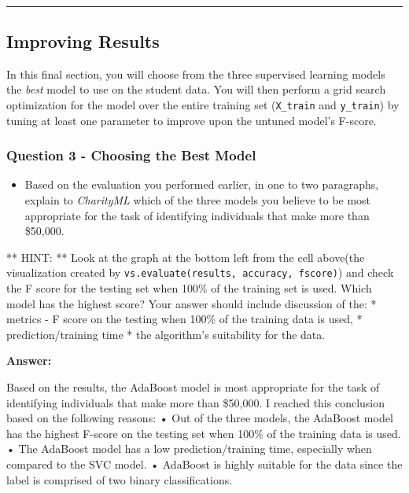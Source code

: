 \documentclass[11pt]{article}
\providecommand{\tightlist}{%
      \setlength{\itemsep}{0pt}\setlength{\parskip}{0pt}}
\begin{document}
    \begin{center}
    \end{center}
    { \hspace*{\fill} \\}
    
    \begin{center}\rule{0.5\linewidth}{\linethickness}\end{center}

\hypertarget{improving-results}{%
\subsection{Improving Results}\label{improving-results}}

In this final section, you will choose from the three supervised
learning models the \emph{best} model to use on the student data. You
will then perform a grid search optimization for the model over the
entire training set (\texttt{X\_train} and \texttt{y\_train}) by tuning
at least one parameter to improve upon the untuned model's F-score.

    \hypertarget{question-3---choosing-the-best-model}{%
\subsubsection{Question 3 - Choosing the Best
Model}\label{question-3---choosing-the-best-model}}

\begin{itemize}
\tightlist
\item
  Based on the evaluation you performed earlier, in one to two
  paragraphs, explain to \emph{CharityML} which of the three models you
  believe to be most appropriate for the task of identifying individuals
  that make more than \$50,000.
\end{itemize}

** HINT: ** Look at the graph at the bottom left from the cell above(the
visualization created by
\texttt{vs.evaluate(results,\ accuracy,\ fscore)}) and check the F score
for the testing set when 100\% of the training set is used. Which model
has the highest score? Your answer should include discussion of the: *
metrics - F score on the testing when 100\% of the training data is
used, * prediction/training time * the algorithm's suitability for the
data.

    \textbf{Answer: }

Based on the results, the AdaBoost model is most appropriate for the
task of identifying individuals that make more than \$50,000. I reached
this conclusion based on the following reasons: • Out of the three
models, the AdaBoost model has the highest F-score on the testing set
when 100\% of the training data is used. • The AdaBoost model has a low
prediction/training time, especially when compared to the SVC model. •
AdaBoost is highly suitable for the data since the label is comprised of
two binary classifications.
\end{document}
